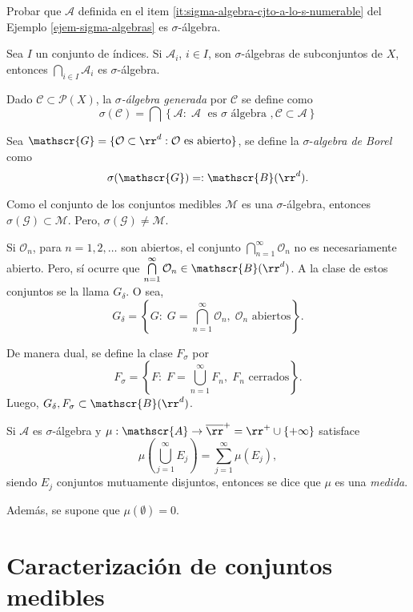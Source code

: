 \begin{ejercicio}{}
Probar que  $\mathscr{A}$ definida en el item \ref{it:sigma-algebra-cjto-a-lo-s-numerable} del Ejemplo \ref{ejem-sigma-algebras} es $\sigma$-\'algebra.
\end{ejercicio}

Sea  $I$ un conjunto de \'indices.
Si $\mathscr{A}_i$, $i \in I$,  son $\sigma$-\'algebras de subconjuntos de $X$, entonces $\bigcap\limits_{i \in I} \mathscr{A}_i$ es $\sigma$-\'algebra. 

Dado $\mathscr{C}\subset \mathscr{P}(X)$, la \emph{$\sigma$-\'algebra
generada} por $\mathscr{C}$ se define como
\[\sigma(\mathscr{C})=\bigcap\left\{\mathscr{A}:\;\mathscr{A}\;\mbox{ es $\sigma$ \'algebra }, \mathscr{C} \subset \mathscr{A} \right \}
\]


Sea $\mathscr{G}=\{\mathcal{O}\subset \rr^d: \mathcal{O} \mbox{ es abierto} \}$, se define la $\sigma$-\emph{\;algebra de Borel} como
\[
\sigma(\mathscr{G})=:\mathscr{B}(\rr^d).
\]

Como el conjunto de los conjuntos medibles $\mathscr{M}$ es una $\sigma$-\'algebra, entonces $\sigma(\mathscr{G})\subset \mathscr{M}$.
Pero, $\sigma(\mathscr{G})\neq \mathscr{M}$.

Si $\mathcal{O}_n$, para $n=1,2,\ldots$ son abiertos, el conjunto
$\bigcap\limits_{n=1}^{\infty} \mathcal{O}_n$ no es necesariamente abierto. Pero, s\'i ocurre que $\bigcap\limits_{n=1}^{\infty} \mathcal{O}_n \in \mathscr{B}(\rr^d)$. 
A la clase de estos conjuntos se la llama $G_{\delta}$.
O sea, 
\[
G_{\delta}=\left\{  
G:\; G=\bigcap\limits_{n=1}^{\infty} \mathcal{O}_n,\; \mathcal{O}_n \mbox{ abiertos}
\right\}.
\]


De manera dual, se define la clase $F_{\sigma}$ por
\[
F_{\sigma}=\left\{  
F:\; F=\bigcup\limits_{n=1}^{\infty} F_n,\; F_n \mbox{ cerrados}
\right\}.
\]
Luego,  $G_{\delta}, F_{\sigma} \subset \mathscr{B}(\rr^d)$.

\begin{definicion}{}
Si $\mathscr{A}$  es $\sigma$-\'algebra y $\mu:\mathscr{A} \to \overline{\rr}^+=\rr^+\cup\{+\infty\}$ satisface
\[\mu\left(\bigcup\limits_{j=1}^{\infty}E_j \right)
=\sum\limits_{j=1}^{\infty}\mu(E_j),
\]
siendo $E_j$ conjuntos mutuamente disjuntos, 
entonces se dice que $\mu$ es una \emph{medida}.

Adem\'as, se supone que $\mu(\emptyset)=0$.
\end{definicion}


\section{Caracterización de conjuntos medibles}


